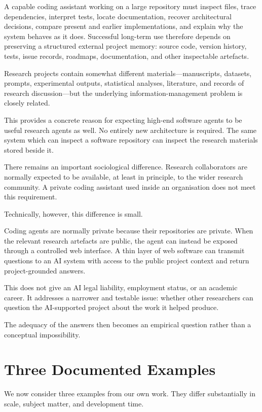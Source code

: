 A capable coding assistant working on a large repository must inspect files, trace dependencies, interpret tests, locate documentation, recover architectural decisions, compare present and earlier implementations, and explain why the system behaves as it does. Successful long-term use therefore depends on preserving a structured external project memory: source code, version history, tests, issue records, roadmaps, documentation, and other inspectable artefacts.

Research projects contain somewhat different materials---manuscripts, datasets, prompts, experimental outputs, statistical analyses, literature, and records of research discussion---but the underlying information-management problem is closely related.

This provides a concrete reason for expecting high-end software agents to be useful research agents as well. No entirely new architecture is required. The same system which can inspect a software repository can inspect the research materials stored beside it.

There remains an important sociological difference. Research collaborators are normally expected to be available, at least in principle, to the wider research community. A private coding assistant used inside an organisation does not meet this requirement.

Technically, however, this difference is small.

Coding agents are normally private because their repositories are private. When the relevant research artefacts are public, the agent can instead be exposed through a controlled web interface. A thin layer of web software can transmit questions to an AI system with access to the public project context and return project-grounded answers.

This does not give an AI legal liability, employment status, or an academic career. It addresses a narrower and testable issue: whether other researchers can question the AI-supported project about the work it helped produce.

The adequacy of the answers then becomes an empirical question rather than a conceptual impossibility.


\section{Three Documented Examples}

We now consider three examples from our own work. They differ substantially in scale, subject matter, and development time.

